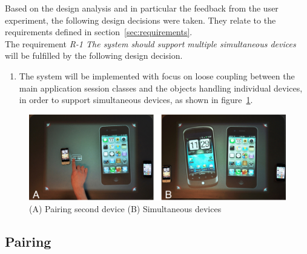 Based on the design analysis and in particular the feedback from the user experiment, the following design decisions were taken.
They relate to the requirements defined in section~\ref{sec:requirements}.
\\
\linebreak
The requirement \emph{R-1 The system should support multiple simultaneous devices} will be fulfilled by the following design decision.
\begin{enumerate}[{D}-1]
\item The system will be implemented with focus on loose coupling between the main application session classes and the objects handling individual devices, in order to support simultaneous devices, as shown in figure~\ref{fig:sq2phones}. 
\end{enumerate}
\begin{figure}[htb]
  \centering
    \includegraphics[width=0.7\linewidth]{images/sq2phones}
  \caption{(A) Pairing second device (B) Simultaneous devices}
  \label{fig:sq2phones}
\end{figure}

\subsection{Pairing}

